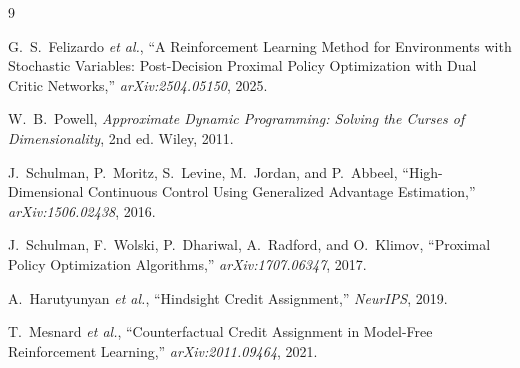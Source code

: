 \documentclass[conference]{IEEEtran}
\begin{document}
\begin{thebibliography}{9}



G.~S.~Felizardo \emph{et al.}, ``A Reinforcement Learning Method for Environments with
Stochastic Variables: Post-Decision Proximal Policy Optimization with Dual Critic
Networks,'' \emph{arXiv:2504.05150}, 2025.

W.~B.~Powell, \emph{Approximate Dynamic Programming: Solving the Curses of
Dimensionality}, 2nd ed. Wiley, 2011.

J.~Schulman, P.~Moritz, S.~Levine, M.~Jordan, and P.~Abbeel, ``High-Dimensional
Continuous Control Using Generalized Advantage Estimation,'' \emph{arXiv:1506.02438},
2016.

J.~Schulman, F.~Wolski, P.~Dhariwal, A.~Radford, and O.~Klimov, ``Proximal Policy
Optimization Algorithms,'' \emph{arXiv:1707.06347}, 2017.

A.~Harutyunyan \emph{et al.}, ``Hindsight Credit Assignment,'' \emph{NeurIPS}, 2019.

T.~Mesnard \emph{et al.}, ``Counterfactual Credit Assignment in Model-Free
Reinforcement Learning,'' \emph{arXiv:2011.09464}, 2021.

\end{thebibliography}
\end{document}
